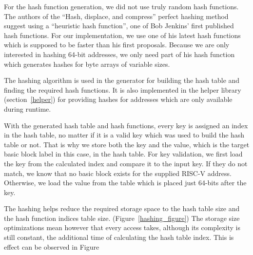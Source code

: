 \documentclass[course=eragp]{aspdoc}
\begin{document}
\begin{enumerate}
          For the hash function generation, we did not use truly random hash functions. The authors of the ``Hash,
          displace, and compress'' perfect hashing method suggest using a ``heuristic hash
          function''\cite{CHD}, one of Bob Jenkins' first published hash functions.\cite{jenkins_hash_1} For
          our implementation, we use one of his latest hash functions which is supposed to be faster than his
          first proposals.\cite{jenkins_hash_2} Because we are only interested in hashing 64-bit addresses, we
          only need part of his hash function which generates hashes for byte arrays of variable sizes.

          \par

          The hashing algorithm is used in the generator for building the hash table and finding the required
          hash functions. It is also implemented in the helper library (section~\ref{helper}) for providing hashes for addresses
          which are only available during runtime.

          \par

          With the generated hash table and hash functions, every key is assigned an index in the hash table,
          no matter if it is a valid key which was used to build the hash table or not. That is why we store
          both the key and the value, which is the target basic block label in this case, in the hash table.
          For key validation, we first load the key from the calculated index and compare it to the input key.
          If they do not match, we know that no basic block exists for the supplied RISC-V address. Otherwise,
          we load the value from the table which is placed just 64-bits after the key.

          \par

          The hashing helps reduce the required storage space to the hash table size and the hash function
          indices table size. (Figure~\ref{hashing_figure}) The storage size optimizations mean however that
          every access takes, although its complexity is still constant, the additional time of calculating
          the hash table index. This is effect can be observed in Figure
\end{enumerate}
\end{document}
